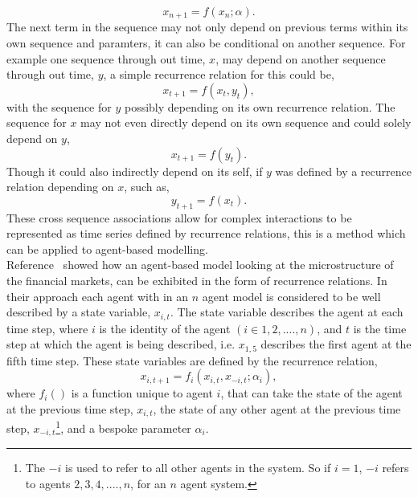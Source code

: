 \documentclass{article}
\begin{document}
\begin{equation}
x_{n+1} = f(x_{n}; \alpha).
\end{equation}
The next term in the sequence may not only depend on previous terms within its own sequence and paramters, it can also be conditional on another sequence. For example one sequence through out time, $x$, may depend on another sequence through out time, $y$, a simple recurrence relation for this could be,
\begin{equation}
x_{t+1} = f(x_{t}, y_{t}),
\end{equation}
with the sequence for $y$ possibly depending on its own recurrence relation. The sequence for $x$ may not even directly depend on its own sequence and could solely depend on $y$, 
\begin{equation}
x_{t+1} = f(y_{t}).
\end{equation}
Though it could also indirectly depend on its self, if $y$ was defined by a recurrence relation depending on $x$, such as, 
\begin{equation}
y_{t+1} = f(x_{t}).
\end{equation}
These cross sequence associations allow for complex interactions to be represented as time series defined by recurrence relations, this is a method which can be applied to agent-based modelling.\\
Reference~\cite{econmistsnoabm} showed how an agent-based model looking at the microstructure of the financial markets, can be exhibited in the form of recurrence relations. In their approach each agent with in an $n$ agent model is considered to be well described by a state variable, $x_{i, t}$. The state variable describes the agent at each time step, where $i$ is the identity of the agent $(i \in 1,2,....,n)$, and $t$ is the time step at which the agent is being described, i.e. $x_{1,5}$ describes the first agent at the fifth time step. These state variables are defined by the recurrence relation,     
\begin{equation} \label{eq:notimedelayrecur}
x_{i, t+1} = f_{i}(x_{i, t}, x_{-i,t}; \alpha_{i}),
\end{equation}
where $f_{i}()$ is a function unique to agent $i$, that can take the state of the agent at the previous time step, $x_{i, t}$, the state of any other agent at the previous time step, $x_{-i, t}$\footnote{The $-i$ is used to refer to all other agents in the system. So if $i=1$, $-i$ refers to agents $2,3,4,....,n$, for an $n$ agent system.}, and a bespoke parameter $\alpha_{i}$.\\
\end{document}
